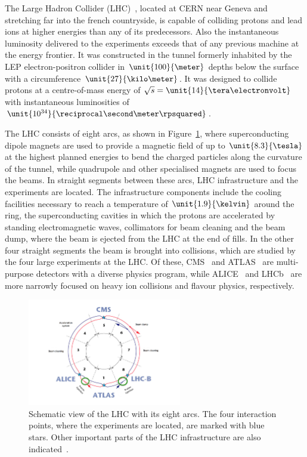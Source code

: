 The Large Hadron Collider (LHC)~\cite{LHC}, located at CERN near Geneva and stretching far into the french countryside, is capable of colliding protons and lead ions at higher energies than any of its predecessors. Also the instantaneous luminosity delivered to the experiments exceeds that of any previous machine at the energy frontier. It was constructed in the tunnel formerly inhabited by the LEP electron-positron collider in $\unit{100}{\meter}$ depths below the surface with a circumference $\unit{27}{\kilo\meter}$. It was designed to collide protons at a centre-of-mass energy of $\sqrt{s} = \unit{14}{\tera\electronvolt}$ with instantaneous luminosities of $\unit{10^{34}}{\reciprocal\second\meter\rpsquared}$. 

The LHC consists of eight arcs, as shown in Figure~\ref{fig:LHC}, where superconducting dipole magnets are used to provide a magnetic field of up to $\unit{8.3}{\tesla}$ at the highest planned energies to bend the charged particles along the curvature of the tunnel, while quadrupole and other specialised magnets are used to focus the beams. In straight segments between these arcs, LHC infrastructure and the experiments are located. The infrastructure components include the cooling facilities necessary to reach a temperature of $\unit{1.9}{\kelvin}$ around the ring, the superconducting cavities in which the protons are accelerated by standing electromagnetic waves, collimators for beam cleaning and the beam dump, where the beam is ejected from the LHC at the end of fills. In the other four straight segments the beam is brought into collisions, which are studied by the four large experiments at the LHC. Of these, CMS~\cite{CMS} and ATLAS~\cite{ATLAS} are multi-purpose detectors with a diverse physics program, while ALICE~\cite{ATLAS} and LHCb~\cite{LHCb} are more narrowly focused on heavy ion collisions and flavour physics, respectively. 

\begin{figure}[htbp]
\centering
  \includegraphics[width=0.6\textwidth]{plots/LHC/LHC_scetch.png}
\caption{Schematic view of the LHC with its eight arcs. The four interaction points, where the experiments are located, are marked with blue stars. Other important parts of the LHC infrastructure are also indicated~\cite{LHCScetch}.}
\label{fig:LHC}
\end{figure}

